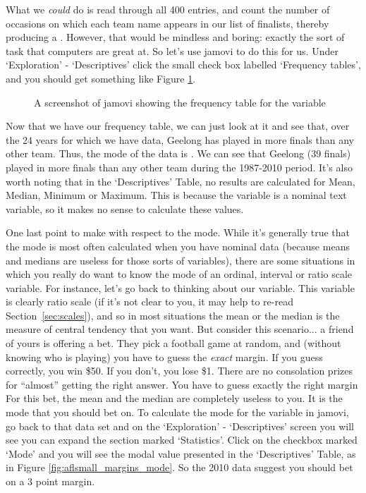 What we {\it could} do is read through all 400 entries, and count the number of occasions on which each team name appears in our list of finalists, thereby producing a . However, that would be mindless and boring: exactly the sort of task that computers are great at. So let's use jamovi to do this for us. Under `Exploration' - `Descriptives' click the small check box labelled `Frequency tables', and you should get something like Figure \ref{fig:aflsmall_finalists_mode}. 

\vspace{1cm}
\begin{figure}[ht]
\begin{center}
\caption{A screenshot of jamovi showing the frequency table for the  variable }
\label{fig:aflsmall_finalists_mode}
\HR
\end{center}
\end{figure}

Now that we have our frequency table, we can just look at it and see that, over the 24 years for which we have data, Geelong has played in more finals than any other team. Thus, the mode of the  data is . We can see that Geelong (39 finals) played in more finals than any other team during the 1987-2010 period. It's also worth noting that in the `Descriptives' Table, no results are calculated for Mean, Median, Minimum or Maximum. This is because the  variable is a nominal text variable, so it makes no sense to calculate these values.

One last point to make with respect to the mode. While it's generally true that the mode is most often calculated when you have nominal data (because means and medians are useless for those sorts of variables), there are some situations in which you really do want to know the mode of an ordinal, interval or ratio scale variable. For instance, let's go back to thinking about our  variable. This variable is clearly ratio scale (if it's not clear to you, it may help to re-read Section~\ref{sec:scales}), and so in most situations the mean or the median is the measure of central tendency that you want. But consider this scenario... a friend of yours is offering a bet. They pick a football game at random, and (without knowing who is playing) you have to guess the {\it exact} margin. If you guess correctly, you win \$50. If you don't, you lose \$1. There are no consolation prizes for ``almost'' getting the right answer. You have to guess exactly the right margin For this bet, the mean and the median are completely useless to you. It is the mode that you should bet on. To calculate the mode for the  variable in jamovi, go back to that data set and on the `Exploration' - `Descriptives' screen you will see you can expand the section marked `Statistics'. Click on the checkbox marked `Mode' and you will see the modal value presented in the `Descriptives' Table, as in Figure \ref{fig:aflsmall_margins_mode}. So the 2010 data suggest you should bet on a 3 point margin.

